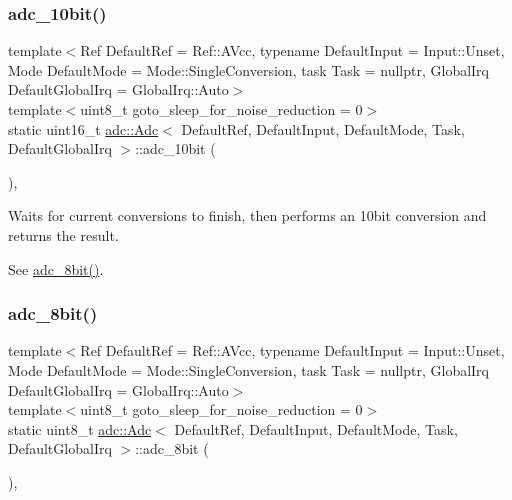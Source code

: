 \subsubsection{\texorpdfstring{adc\+\_\+10bit()}{adc\_10bit()}}
{\footnotesize\ttfamily template$<$Ref Default\+Ref = Ref\+::\+A\+Vcc, typename Default\+Input  = Input\+::\+Unset, Mode Default\+Mode = Mode\+::\+Single\+Conversion, task Task = nullptr, Global\+Irq Default\+Global\+Irq = Global\+Irq\+::\+Auto$>$ \\
template$<$uint8\+\_\+t goto\+\_\+sleep\+\_\+for\+\_\+noise\+\_\+reduction = 0$>$ \\
static uint16\+\_\+t \hyperlink{classadc_1_1Adc}{adc\+::\+Adc}$<$ Default\+Ref, Default\+Input, Default\+Mode, Task, Default\+Global\+Irq $>$\+::adc\+\_\+10bit (\begin{DoxyParamCaption}{ }\end{DoxyParamCaption})\hspace{0.3cm}{\ttfamily [inline]}, {\ttfamily [static]}}



Waits for current conversions to finish, then performs an 10bit conversion and returns the result. 

See \hyperlink{classadc_1_1Adc_ae289bfed72b4cfab79dae680cc4d9ab4}{adc\+\_\+8bit()}. \hypertarget{classadc_1_1Adc_ae289bfed72b4cfab79dae680cc4d9ab4}{}\label{classadc_1_1Adc_ae289bfed72b4cfab79dae680cc4d9ab4} 
\subsubsection{\texorpdfstring{adc\+\_\+8bit()}{adc\_8bit()}}
{\footnotesize\ttfamily template$<$Ref Default\+Ref = Ref\+::\+A\+Vcc, typename Default\+Input  = Input\+::\+Unset, Mode Default\+Mode = Mode\+::\+Single\+Conversion, task Task = nullptr, Global\+Irq Default\+Global\+Irq = Global\+Irq\+::\+Auto$>$ \\
template$<$uint8\+\_\+t goto\+\_\+sleep\+\_\+for\+\_\+noise\+\_\+reduction = 0$>$ \\
static uint8\+\_\+t \hyperlink{classadc_1_1Adc}{adc\+::\+Adc}$<$ Default\+Ref, Default\+Input, Default\+Mode, Task, Default\+Global\+Irq $>$\+::adc\+\_\+8bit (\begin{DoxyParamCaption}{ }\end{DoxyParamCaption})\hspace{0.3cm}{\ttfamily [inline]}, {\ttfamily [static]}}



